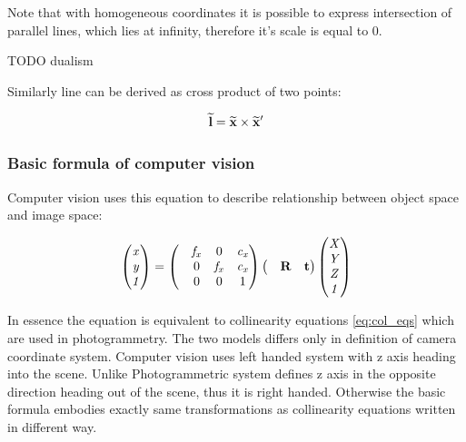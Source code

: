\documentclass[a4paper,12pt]{article}
\newcommand{\ematr}[1]{
{\bf #1}
}
\newcommand{\evect}[1]{
{\bf #1}
}
\newcommand{\ehvect}[1]{
{\bf \widetilde{#1}}
}
\newcommand{\escal}[1]{
{\it #1}
}
\begin{document}
Note that with homogeneous coordinates it is possible to express intersection of parallel lines, which lies at infinity, 
therefore it's scale is equal to 0.

TODO dualism

Similarly line can be derived as cross product of two points:

\begin{equation}
\ehvect{l} = \ehvect{x} \times \ehvect{x}'
\end{equation}


\subsubsection{Basic formula of computer vision}

Computer vision uses this equation to describe relationship between
object space and image space:

\begin{equation}
\begin{pmatrix}
   \escal{x} \\
   \escal{y} \\
   \escal{1} \\
\end{pmatrix}
=
\begin{pmatrix}
   & \escal{f_{x}} & 0     & \escal{c_{x}}\\
   & 0     & \escal{f_{x}} & \escal{c_{x}}\\
   & 0     & 0     & 1\\
\end{pmatrix}
\begin{pmatrix}
&\ematr{R}&\evect{t}\\
\end{pmatrix}
\begin{pmatrix}
   \escal{X} \\
   \escal{Y} \\
   \escal{Z} \\
   \escal{1} \\
\end{pmatrix}
\end{equation}

In essence the equation is equivalent to collinearity equations \eqref{eq:col_eqs} which are used in photogrammetry.
The two models differs only in definition of camera coordinate system.
Computer vision uses left handed system with z axis heading into 
the scene. Unlike  Photogrammetric system defines z axis in the opposite direction heading out of the scene, thus 
it is right handed. Otherwise the basic formula embodies exactly same transformations as 
collinearity equations written in different way.
\end{document}
